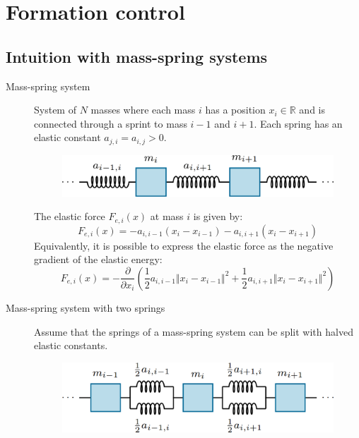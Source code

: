 \chapter{Formation control}


\section{Intuition with mass-spring systems}

\begin{description}
    \item[Mass-spring system] 
        System of $N$ masses where each mass $i$ has a position $x_i \in \mathbb{R}$ and is connected through a sprint to mass $i-1$ and $i+1$. Each spring has an elastic constant $a_{j, i} = a_{i, j} > 0$.

        \begin{figure}[H]
            \centering
            \includegraphics[width=0.5\linewidth]{./img/mass_spring_system.png}
        \end{figure}

        The elastic force $F_{e,i}(x)$ at mass $i$ is given by:
        \[
            F_{e,i}(x) = -a_{i,i-1}(x_i-x_{i-1}) - a_{i,i+1}(x_i - x_{i+1})
        \]
        Equivalently, it is possible to express the elastic force as the negative gradient of the elastic energy:
        \[
            F_{e,i}(x) = -\frac{\partial}{\partial x_i}\left( \frac{1}{2} a_{i,i-1} \Vert x_i - x_{i-1} \Vert^2 + \frac{1}{2} a_{i,i+1} \Vert x_i - x_{i+1} \Vert^2 \right)
        \]

    \item[Mass-spring system with two springs] 
        Assume that the springs of a mass-spring system can be split with halved elastic constants.
        \begin{figure}[H]
            \centering
            \includegraphics[width=0.5\linewidth]{./img/mass_spring_system2.png}
        \end{figure}


\end{description}
